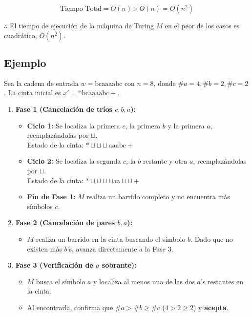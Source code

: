 $$\text{Tiempo Total} = O(n) \times O(n) = O(n^2)$$

$\therefore$ El tiempo de ejecución de la máquina de Turing $M$ en el peor de los casos es cuadrático, $O(n^2)$.

\subsection{Ejemplo}

Sea la cadena de entrada $w = \text{bcaaaabc}$ con $n = 8$, donde $\#a=4, \#b=2, \#c=2$. La cinta inicial es $x' = *\text{bcaaaabc}+$.

\begin{enumerate}
    \item \textbf{Fase 1 (Cancelación de tríos $c, b, a$):}
    \begin{itemize}
        \item \textbf{Ciclo 1:} Se localiza la primera $c$, la primera $b$ y la primera $a$, reemplazándolas por $\sqcup$. \\
        Estado de la cinta: $*\sqcup\sqcup\sqcup\text{aaabc}+$
        \item \textbf{Ciclo 2:} Se localiza la segunda $c$, la $b$ restante y otra $a$, reemplazándolas por $\sqcup$. \\
        Estado de la cinta: $*\sqcup\sqcup\sqcup\sqcup\text{aa}\sqcup\sqcup+$
        \item \textbf{Fin de Fase 1:} $M$ realiza un barrido completo y no encuentra más símbolos $c$.
    \end{itemize}
    
    \item \textbf{Fase 2 (Cancelación de pares $b, a$):}
    \begin{itemize}
        \item $M$ realiza un barrido en la cinta buscando el símbolo $b$. Dado que no existen más $b$'s, avanza directamente a la Fase 3.
    \end{itemize}
    
    \item \textbf{Fase 3 (Verificación de $a$ sobrante):}
    \begin{itemize}
        \item $M$ busca el símbolo $a$ y localiza al menos una de las dos $a$'s restantes en la cinta.
        \item Al encontrarla, confirma que $\#a > \#b \ge \#c$ ($4 > 2 \ge 2$) y \textbf{acepta}.
    \end{itemize}
\end{enumerate}
